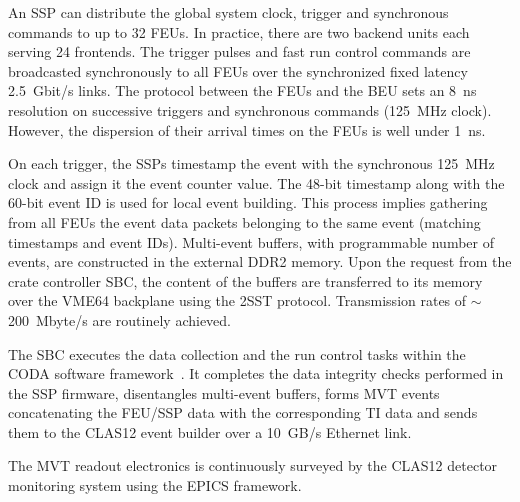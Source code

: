 An SSP can distribute the global system clock, trigger and synchronous commands to up to 32 FEUs. In practice, there are two backend units each serving 24 frontends. The trigger pulses and fast run control commands are broadcasted synchronously to all FEUs over the synchronized fixed latency 2.5~Gbit/s links. The protocol between the FEUs and the BEU sets an 8~ns resolution on successive triggers and synchronous commands (125~MHz clock). However, the dispersion of their arrival times on the FEUs is well under 1~ns.

On each trigger, the SSPs timestamp the event with the synchronous 125~MHz clock and assign it the event counter value. The 48-bit timestamp along with the 60-bit event ID is used for local event building. This process implies gathering from all FEUs the event data packets belonging to the same event (matching timestamps and event IDs). Multi-event buffers, with programmable number of events, are constructed in the external DDR2 memory. Upon the request from the crate controller SBC, the content of the buffers are transferred to its memory over the VME64 backplane using the 2SST protocol. Transmission rates of $\sim$200~Mbyte/s are routinely achieved.

The SBC executes the data collection and the run control tasks within the CODA software framework~\cite{CODA}. It completes the data integrity checks performed in the SSP firmware, disentangles multi-event buffers, forms MVT events concatenating the FEU/SSP data with the corresponding TI data and sends them to the CLAS12 event builder over a 10~GB/s Ethernet link.

The MVT readout electronics is continuously surveyed by the CLAS12 detector monitoring system using the EPICS framework.

